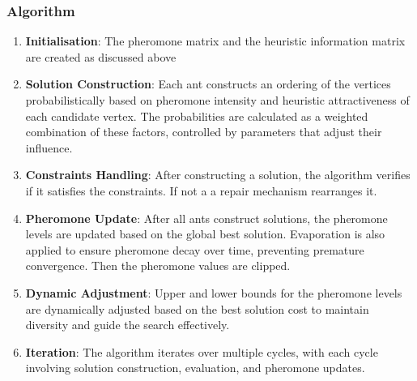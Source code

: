 \documentclass{article}
\begin{document}
\subsubsection*{Algorithm}
\begin{enumerate}
    \item \textbf{Initialisation}: The pheromone matrix and the heuristic information matrix are created as discussed above
    \item \textbf{Solution Construction}: Each ant constructs an ordering of the vertices probabilistically based on pheromone intensity and heuristic attractiveness of each candidate vertex. The probabilities are calculated as a weighted combination of these factors, controlled by parameters that adjust their influence.
    \item \textbf{Constraints Handling}: After constructing a solution, the algorithm verifies if it satisfies the constraints. If not a a repair mechanism rearranges it.
    \item \textbf{Pheromone Update}: After all ants construct solutions, the pheromone levels are updated based on the global best solution. Evaporation is also applied to ensure pheromone decay over time, preventing premature convergence. Then the pheromone values are clipped.
    \item \textbf{Dynamic Adjustment}: Upper and lower bounds for the pheromone levels are dynamically adjusted based on the best solution cost to maintain diversity and guide the search effectively.
    \item \textbf{Iteration}: The algorithm iterates over multiple cycles, with each cycle involving solution construction, evaluation, and pheromone updates.

\end{enumerate}
\end{document}

